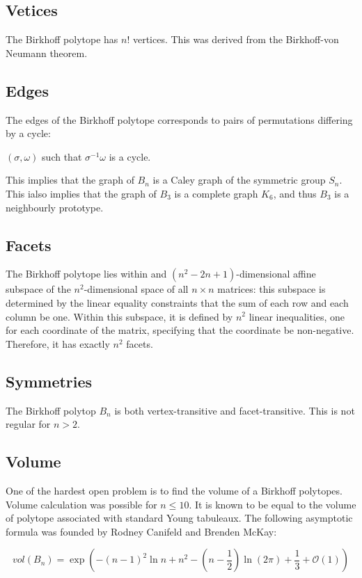 \subsection{Vetices}
The Birkhoff polytope has $n!$ vertices. This was derived from the Birkhoff-von Neumann theorem.
\subsection{Edges}
The edges of the Birkhoff polytope corresponds to pairs of permutations differing by a cycle:

$(\sigma,\omega)$ such that $\sigma^{-1}\omega$ is a cycle.

This implies that the graph of $B_n$ is a Caley graph of the symmetric group $S_n$. This ialso implies that the graph of $B_3$ is a complete graph $K_6$, and thus $B_3$ is a neighbourly prototype.

\subsection{Facets}
The Birkhoff polytope lies within and $(n^2-2n+1)$-dimensional affine subspace of the $n^2$-dimensional space of all $n\times n$ matrices: this subspace is determined by the linear equality constraints that the sum of each row and each column be one. Within this subspace, it is defined by $n^2$ linear inequalities, one for each coordinate of the matrix, specifying that the coordinate be non-negative. Therefore, it has exactly $n^2$ facets.

\subsection{Symmetries}
The Birkhoff polytop $B_n$ is both vertex-transitive and facet-transitive. This is not regular for $n>2$.

\subsection{Volume}
One of the hardest open problem is to find the volume of a Birkhoff polytopes. Volume calculation was possible for $n\leqslant 10$. It is known to be equal to the volume of polytope associated with standard Young tabuleaux. The following asymptotic formula was founded by Rodney Canifeld and Brenden McKay:

\begin{equation}
vol(B_n)=\exp(-(n-1)^2 \ln n + n^2 - (n-\frac{1}{2} )\ln(2\pi)+\frac{1}{3}+\mathcal{O}(1))
\label{eqn:Birkhoff_volume}
\end{equation}	

